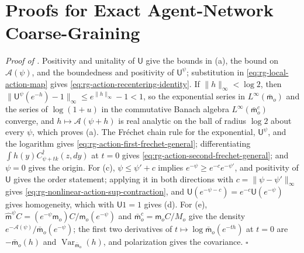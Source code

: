 \section{Proofs for Exact Agent-Network Coarse-Graining}
\label{sec:proofs-network-coarsegraining}

\noindent\emph{Proof of .}
Positivity and unitality of $\mathsf U$ give the bounds in (a), the bound on
$\mathcal A(\psi)$, and the boundedness and positivity of $\mathsf U^\psi$;
substitution in \eqref{eq:rg-local-action-map} gives
\eqref{eq:rg-action-recentering-identity}. If $\lVert h\rVert_\infty<\log2$, then
$\lVert\mathsf U^\psi(e^{-h})-1\rVert_\infty\le e^{\lVert h\rVert_\infty}-1<1$, so
the exponential series in $L^\infty(\bar{\mathsf m}_o)$ and the series of
$\log(1+u)$ in the commutative Banach algebra $L^\infty(\bar{\mathsf m}_o^c)$
converge, and $h\mapsto\mathcal A(\psi+h)$ is real analytic on the ball of radius
$\log2$ about every $\psi$, which proves (a). The Fr\'echet chain rule for the
exponential, $\mathsf U^\psi$, and the logarithm gives
\eqref{eq:rg-action-first-frechet-general}; differentiating
$\int h(y)C^\dagger_{\psi+tk}(z,dy)$ at $t=0$ gives
\eqref{eq:rg-action-second-frechet-general}; and $\psi=0$ gives the origin. For (c),
$\psi\le\psi'+c$ implies $e^{-\psi}\ge e^{-c}e^{-\psi'}$, and positivity of
$\mathsf U$ gives the order statement; applying it in both directions with
$c=\lVert\psi-\psi'\rVert_\infty$ gives
\eqref{eq:rg-nonlinear-action-sup-contraction}, and
$\mathsf U(e^{-\psi-c})=e^{-c}\mathsf U(e^{-\psi})$ gives homogeneity, which with
$\mathsf U1=1$ gives (d). For (e),
$\widehat{\mathsf m}^\psi C=(e^{-\psi}\mathsf m_o)C/\mathsf m_o(e^{-\psi})$ and
$\bar{\mathsf m}_o^c=\mathsf m_oC/M_o$ give the density
$e^{-\mathcal A(\psi)}/\bar{\mathsf m}_o(e^{-\psi})$; the first two derivatives of
$t\mapsto\log\bar{\mathsf m}_o(e^{-th})$ at $t=0$ are $-\bar{\mathsf m}_o(h)$ and
$\operatorname{Var}_{\bar{\mathsf m}_o}(h)$, and polarization gives the covariance.
$\square$

